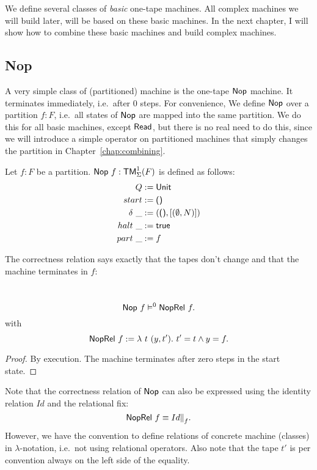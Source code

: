 We define several classes of \emph{basic} one-tape machines.  All complex machines we will build later, will be based on these basic machines.  In the
next chapter, I will show how to combine these basic machines and build complex machines.


\subsection{Nop}
\label{sec:basic_machines-Nop}

A very simple class of (partitioned) machine is the one-tape $\textsf{Nop}$ machine.  It terminates immediately, i.e.\ after 0 steps.  For convenience, We
define $\textsf{Nop}$ over a partition $f:F$, i.e.\ all states of $\textsf{Nop}$ are mapped into the same partition.  We do this for all basic machines, except
$\textsf{Read}$, but there is no real need to do this, since we will introduce a simple operator on partitioned machines that simply changes the partition
in Chapter~\ref{chap:combining}.
\begin{definition}[Nop]
  \label{def:Nop}
  Let $f:F$ be a partition.  $\textsf{Nop}~f: \textsf{TM}_\Sigma^1(F)$ is defined as follows:
  \begin{align*}
    Q          &:= \textsf{Unit} \\
    start      &:= \textsf{()} \\
    \delta ~\_ &:= (\textsf{()}, \left[ (\emptyset, N) \right]) \\
    halt   ~\_ &:= \textsf{true} \\
    part   ~\_ &:= f
  \end{align*}
\end{definition}
The correctness relation says exactly that the tapes don't change and that the machine terminates in $f$:
\begin{lemma}
  \label{lem:Nop_Sem}
  ~
  \[
    \textsf{Nop}~f \vDash^0 \textsf{NopRel}~f.
  \]
  with
  \[
    \textsf{NopRel}~f := \lambda~t~(y,t').~ t' = t \land y = f.
  \]
\end{lemma}
\begin{proof}
  By execution.  The machine terminates after zero steps in the start state.
\end{proof}

Note that the correctness relation of $\textsf{Nop}$ can also be expressed using the identity relation $Id$ and the relational fix:
\[
  \textsf{NopRel}~f \equiv Id {|\mkern-1.5mu|}_{f}.
\]
However, we have the convention to define relations of concrete machine (classes) in $\lambda$-notation, i.e.\ not using relational operators.  Also
note that the tape $t'$ is per convention always on the left side of the equality.

